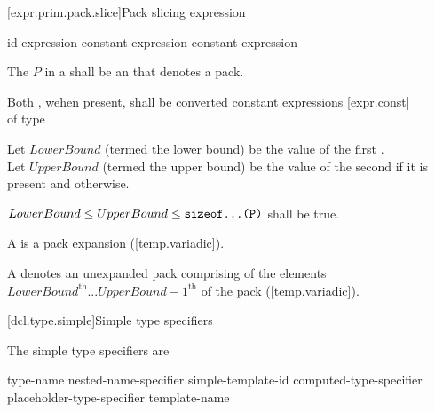 \documentclass{wg21}
\begin{document}
\begin{addedblock}

[expr.prim.pack.slice]{Pack slicing expression}

\begin{bnf}
    \br
    id-expression  \terminal{[} constant-expression \terminal{:} constant-expression\opt \terminal{]}  \br
\end{bnf}

The  $P$  in a  shall be an  that denotes a pack.

Both , wehen present, shall be converted constant expressions [expr.const]\\
of type .

Let $LowerBound$ (termed the lower bound) be the value of the first .\\
Let $UpperBound$ (termed the upper bound) be the value of the second  if it is present and  otherwise.

$LowerBound \leq UpperBound \leq \texttt{sizeof...(P)}$ shall be true.

A  is a pack expansion ([temp.variadic]).

\begin{note}
A  denotes an unexpanded pack comprising of the elements $LowerBound^\text{th} ... UpperBound-1^\text{th}$ of the pack ([temp.variadic]).
\end{note}

\end{addedblock}

\ednote{[...]}

[dcl.type.simple]{Simple type specifiers}%

\pnum
The simple type specifiers are

\begin{bnf}
\br
{} type-name\br
nested-name-specifier  simple-template-id\br\textbf{}
computed-type-specifier\br
placeholder-type-specifier\br
{} template-name\br
\end{bnf}
\end{document}
